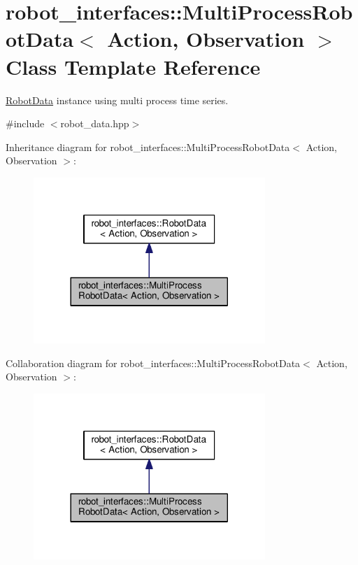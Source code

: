 \hypertarget{classrobot__interfaces_1_1MultiProcessRobotData}{}\section{robot\+\_\+interfaces\+:\+:Multi\+Process\+Robot\+Data$<$ Action, Observation $>$ Class Template Reference}
\label{classrobot__interfaces_1_1MultiProcessRobotData}


\hyperlink{classrobot__interfaces_1_1RobotData}{Robot\+Data} instance using multi process time series.  




{\ttfamily \#include $<$robot\+\_\+data.\+hpp$>$}



Inheritance diagram for robot\+\_\+interfaces\+:\+:Multi\+Process\+Robot\+Data$<$ Action, Observation $>$\+:
\nopagebreak
\begin{figure}[H]
\begin{center}
\leavevmode
\includegraphics[width=248pt]{classrobot__interfaces_1_1MultiProcessRobotData__inherit__graph}
\end{center}
\end{figure}


Collaboration diagram for robot\+\_\+interfaces\+:\+:Multi\+Process\+Robot\+Data$<$ Action, Observation $>$\+:
\nopagebreak
\begin{figure}[H]
\begin{center}
\leavevmode
\includegraphics[width=248pt]{classrobot__interfaces_1_1MultiProcessRobotData__coll__graph}
\end{center}
\end{figure}
